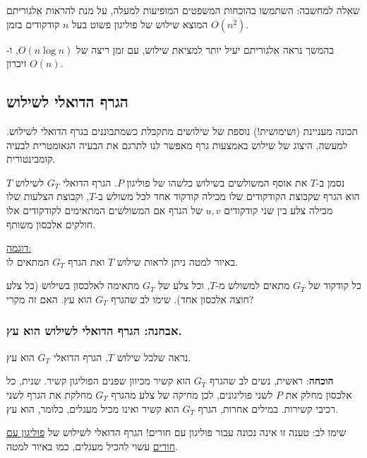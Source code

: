\documentclass[
]{book}
\begin{document}
שאלה למחשבה: השתמשו בהוכחות המשפטים המופיעות למעלה, על מנת להראות אלגוריתם המוצא שילוש של פוליגון פשוט בעל \(n\) קודקודים בזמן \(O(n^2)\).

בהמשך נראה אלגוריתם יעיל יותר למציאת שילוש, עם זמן ריצה של \(O(n \log n)\), ו-\(O(n)\) זיכרון.

\hypertarget{dual-graph}{%
\subsection{הגרף הדואלי לשילוש}\label{dual-graph}}

תכונה מעניינת (ושימושית!) נוספת של שילושים מתקבלת כשמתבוננים בגרף הדואלי לשילוש. למעשה, היצוג של שילוש באמצעות גרף מאפשר לנו לתרגם את הבעיה הגאומטרית לבעיה קומבינטורית.

נסמן ב-\(T\) את אוסף המשולשים בשילוש כלשהו של פוליגון \(P\). הגרף הדואלי \(G_T\) לשילוש \(T\) הוא הגרף שקבוצת הקודקודים שלו מכילה קודקוד אחד לכל משולש ב-\(T\), וקבוצת הצלעות שלו מכילה צלע בין שני קודקודים \(u,v\) של הגרף אם המשולשים המתאימים לקודקודים אלו חולקים אלכסון משותף.

\ul{דוגמה:\\
}באיור למטה ניתן לראות שילוש \(T\) ואת הגרף \(G_T\) המתאים לו.

כל קודקוד של \(G_T\) מתאים למשולש מ-\(T\), וכל צלע של \(G_T\) מתאימה לאלכסון בשילוש (כל צלע חוצה אלכסון אחד). שימו לב שהגרף \(G_T\) הוא עץ. האם זה מקרי?

\hypertarget{ux5d0ux5d1ux5d7ux5e0ux5d4-ux5d4ux5d2ux5e8ux5e3-ux5d4ux5d3ux5d5ux5d0ux5dcux5d9-ux5dcux5e9ux5d9ux5dcux5d5ux5e9-ux5d4ux5d5ux5d0-ux5e2ux5e5.}{%
\subsubsection*{אבחנה: הגרף הדואלי לשילוש הוא עץ.}\label{ux5d0ux5d1ux5d7ux5e0ux5d4-ux5d4ux5d2ux5e8ux5e3-ux5d4ux5d3ux5d5ux5d0ux5dcux5d9-ux5dcux5e9ux5d9ux5dcux5d5ux5e9-ux5d4ux5d5ux5d0-ux5e2ux5e5.}}

נראה שלכל שילוש \(T\), הגרף הדואלי \(G_T\) הוא עץ.

\textbf{הוכחה}: ראשית, נשים לב שהגרף \(G_T\) הוא קשיר מכיוון שפנים הפוליגון קשיר. שנית, כל אלכסון מחלק את \(P\) לשני פוליגונים, לכן מחיקה של צלע מהגרף \(G_T\) מחלקת את הגרף לשני רכיבי קשירות. במילים אחרות, הגרף \(G_T\) הוא קשיר ואינו מכיל מעגלים, כלומר, הוא עץ.

שימו לב: טענה זו אינה נכונה עבור פוליגון עם חורים! הגרף הדואלי לשילוש של \ul{פוליגון עם חורים} עשוי להכיל מעגלים, כמו באיור למטה.
\end{document}
